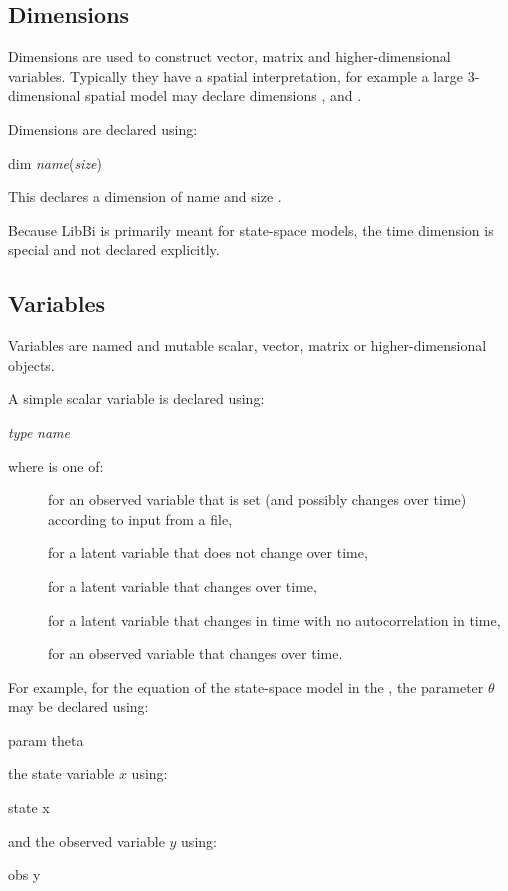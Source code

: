 \subsection{Dimensions\label{Dimensions}}

 Dimensions are used to construct
vector, matrix and
higher-dimensional variables. Typically they have a
spatial interpretation, for example a large 3-dimensional spatial
model may declare dimensions ,  and
.

Dimensions are declared using:
\begin{bicode}
dim \emph{name}(\emph{size})
\end{bicode}
This declares a dimension of name  and size
.

\begin{tip}
Because LibBi is primarily meant for state-space models, the time dimension is
special and not declared explicitly.
\end{tip}

\subsection{Variables\label{Variables}}

 Variables are named and mutable
scalar, vector, matrix or
higher-dimensional objects.

A simple scalar variable is declared using:
\begin{bicode}
\emph{type} \emph{name}
\end{bicode}
where  is one of:
\begin{description}
\item[] for an observed variable that is set (and possibly changes
  over time) according to input from a file,
\item[] for a latent variable that does not change over time,
\item[] for a latent variable that changes over time,
\item[] for a latent variable that changes in time with no
  autocorrelation in time,
\item[] for an observed variable that changes over time.
\end{description}
For example, for the equation of the state-space model in the
, the parameter $\theta$ may be declared
using:
\begin{bicode}
param theta
\end{bicode}
the state variable $x$ using:
\begin{bicode}
state x
\end{bicode}
and the observed variable $y$ using:
\begin{bicode}
obs y
\end{bicode}

